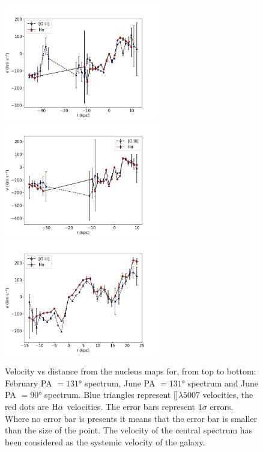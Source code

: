 \documentclass[../thesis.tex]{subfiles}
\begin{document}
\begin{figure}
\centering
\includegraphics[width=0.6\textwidth]{images/paper3/PA131_2016_velocity.jpg}\\ 
\includegraphics[width=0.6\textwidth]{images/paper3/PA131_velocity.jpg}\\ 
\includegraphics[width=0.6\textwidth]{images/paper3/PA90_velocity.jpg}\\ 
\caption[]{Velocity vs distance from the nucleus maps for, from top to bottom: February PA $=\ang{131}$ spectrum, June PA $=\ang{131}$ spectrum and June PA $=\ang{90}$ spectrum. Blue triangles represent []$\lambda5007$ velocities, the red dots are $\rm H\alpha$ velocities.
The error bars represent $1\sigma$ errors. Where no error bar is presents it means that the error bar is smaller than the size of the point. The velocity of the central spectrum has been considered as the systemic velocity of the galaxy.} 
\label{fig:velocity_lines}
\end{figure} 
\end{document}
